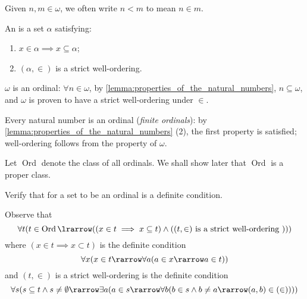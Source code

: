 \documentclass[notoc,notitlepage]{tufte-book}
\DeclareMathOperator{\Ord}{Ord }
\begin{document}
\begin{note}
  Given $n, m \in \omega$, we often write $n < m$ to mean $n \in m$.
\end{note}

\begin{defn}[Ordinals]
\label{defn:ordinals}
  An  is a set $\alpha$ satisfying:
  \begin{enumerate}
    \item $x \in \alpha \implies x \subseteq \alpha$;
    \item $(\alpha, \in)$ is a strict well-ordering.
  \end{enumerate}
\end{defn}

\begin{eg}
  $\omega$ is an ordinal: $\forall n \in \omega$, by \cref{lemma:properties_of_the_natural_numbers}, $n \subseteq \omega$, and $\omega$ is proven to have a strict well-ordering under $\in$.
\end{eg}

\begin{eg}
  Every natural number is an ordinal (\textit{finite ordinals}): by \cref{lemma:properties_of_the_natural_numbers} (2), the first property is satisfied; well-ordering follows from the property of $\omega$.
\end{eg}

Let $\Ord$ denote the class of all ordinals. We shall show later that $\Ord$ is a proper class.

\begin{ex}
  Verify that for a set to be an ordinal is a definite condition.

  Observe that
  \begin{equation*}
    \forall t ( t \in \Ord \lrarrow ( ( x \in t \implies x \subseteq t ) \land ( (t, \in) \text{ is a strict well-ordering } ) ) )
  \end{equation*}
  where $( x \in t \implies x \subset t )$ is the definite condition
  \begin{equation*}
    \forall x ( x \in t \rarrow \forall a ( a \in x \rarrow a \in t ) )
  \end{equation*}
  and $(t, \in)$ is a strict well-ordering is the definite condition
  \begin{equation*}
    \forall s ( s \subseteq t \land s \neq \emptyset \rarrow \exists a ( a \in s \rarrow \forall b ( b \in s \land b \neq a \rarrow (a, b) \in (\in)) ) )
  \end{equation*}
\end{ex}
\end{document}
